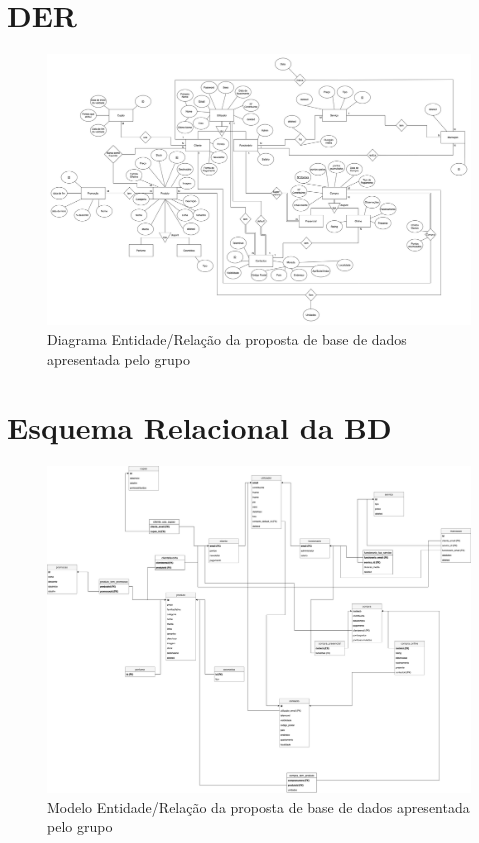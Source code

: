 \documentclass[10pt,portuguese]{article}
\begin{document}
\clearpage

\section{DER}

\begin{figure}[!h]
    \centering
    \includegraphics[width=\textwidth]{images/DER.png}
    \caption{Diagrama Entidade/Relação da proposta de base de dados apresentada pelo grupo}
\end{figure}

\clearpage

\section{Esquema Relacional da BD}

\begin{figure}[!h]
    \centering
    \includegraphics[width=\textwidth]{images/ER.png}
    \caption{Modelo Entidade/Relação da proposta de base de dados apresentada pelo grupo}
\end{figure}
\end{document}
